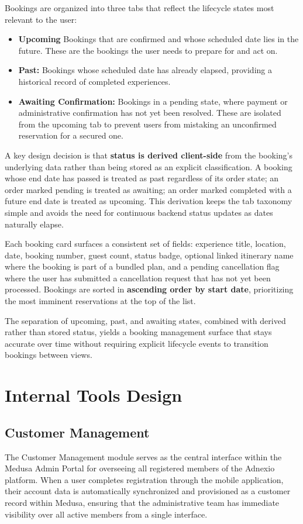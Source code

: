 Bookings are organized into three tabs that reflect the lifecycle states most relevant to the user:
\begin{itemize}
    \item \textbf{Upcoming} Bookings that are confirmed and whose scheduled date lies in the future. These are the bookings the user needs to prepare for and act on.
    \item \textbf{Past:} Bookings whose scheduled date has already elapsed, providing a historical record of completed experiences.
    \item \textbf{Awaiting Confirmation:} Bookings in a pending state, where payment or administrative confirmation has not yet been resolved. These are isolated from the upcoming tab to prevent users from mistaking an unconfirmed reservation for a secured one.
\end{itemize}
A key design decision is that \textbf{status is derived client-side} from the booking's underlying data rather than being stored as an explicit classification. A booking whose end date has passed is treated as past regardless of its order state; an order marked pending is treated as awaiting; an order marked completed with a future end date is treated as upcoming. This derivation keeps the tab taxonomy simple and avoids the need for continuous backend status updates as dates naturally elapse.

Each booking card surfaces a consistent set of fields: experience title, location, date, booking number, guest count, status badge, optional linked itinerary name where the booking is part of a bundled plan, and a pending cancellation flag where the user has submitted a cancellation request that has not yet been processed. Bookings are sorted in \textbf{ascending order by start date}, prioritizing the most imminent reservations at the top of the list.

The separation of upcoming, past, and awaiting states, combined with derived rather than stored status, yields a booking management surface that stays accurate over time without requiring explicit lifecycle events to transition bookings between views.

\section{Internal Tools Design}
\label{section:Internal Tools Design}
\subsection{Customer Management}
\label{subsection:Customer Management}
The Customer Management module serves as the central interface within the Medusa Admin Portal for overseeing all registered members of the Adnexio platform. When a user completes registration through the mobile application, their account data is automatically synchronized and provisioned as a customer record within Medusa, ensuring that the administrative team has immediate visibility over all active members from a single interface.

